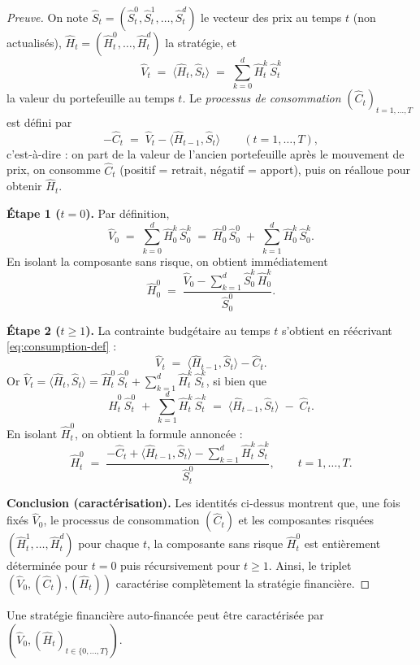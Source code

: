 \begin{proof}[Preuve]
On note $\hat S_t=(\hat S_t^0,\hat S_t^1,\ldots,\hat S_t^d)$ le vecteur des prix au temps $t$ (non actualisés),
$\hat H_t=(\hat H_t^0,\ldots,\hat H_t^d)$ la stratégie, et
\[
\hat V_t \;=\; \langle \hat H_t,\hat S_t\rangle \;=\; \sum_{k=0}^d \hat H_t^k\,\hat S_t^k
\]
la valeur du portefeuille au temps $t$.
Le \emph{processus de consommation} $(\hat C_t)_{t=1,\ldots,T}$ est défini par
\begin{equation}\label{eq:consumption-def}
-\hat C_t \;=\; \hat V_t - \langle \hat H_{t-1}, \hat S_t\rangle
\qquad (t=1,\ldots,T),
\end{equation}
c'est-à-dire : on part de la valeur de l'ancien portefeuille après le mouvement de prix,
on consomme $\hat C_t$ (positif = retrait, négatif = apport), puis on réalloue pour obtenir $\hat H_t$.

\smallskip
\noindent\textbf{Étape 1 ($t=0$).}
Par définition,
\[
\hat V_0 \;=\; \sum_{k=0}^d \hat H_0^k\,\hat S_0^k
\;=\; \hat H_0^0\,\hat S_0^0 \;+\; \sum_{k=1}^d \hat H_0^k\,\hat S_0^k.
\]
En isolant la composante sans risque, on obtient immédiatement
\[
\hat H_0^0 \;=\; \frac{\hat V_0 - \sum_{k=1}^d \hat S_0^k\,\hat H_0^k}{\hat S_0^0}.
\]

\smallskip
\noindent\textbf{Étape 2 ($t\ge 1$).}
La contrainte budgétaire au temps $t$ s'obtient en réécrivant \eqref{eq:consumption-def} :
\[
\hat V_t \;=\; \langle \hat H_{t-1}, \hat S_t\rangle - \hat C_t.
\]
Or $\hat V_t=\langle \hat H_t,\hat S_t\rangle = \hat H_t^0\,\hat S_t^0 + \sum_{k=1}^d \hat H_t^k\,\hat S_t^k$,
si bien que
\[
\hat H_t^0\,\hat S_t^0 \;+\; \sum_{k=1}^d \hat H_t^k\,\hat S_t^k
\;=\; \langle \hat H_{t-1}, \hat S_t\rangle \;-\; \hat C_t.
\]
En isolant $\hat H_t^0$, on obtient la formule annoncée :
\[
\hat H_t^0 \;=\; \frac{-\hat C_t + \langle \hat H_{t-1}, \hat S_t\rangle - \sum_{k=1}^d \hat H_t^k\,\hat S_t^k}{\hat S_t^0},
\qquad t=1,\ldots,T.
\]

\smallskip
\noindent\textbf{Conclusion (caractérisation).}
Les identités ci-dessus montrent que, une fois fixés
$\hat V_0$, le processus de consommation $(\hat C_t)$ et les composantes risquées
$(\hat H_t^1,\ldots,\hat H_t^d)$ pour chaque $t$, la composante sans risque $\hat H_t^0$
est entièrement déterminée pour $t=0$ puis récursivement pour $t\ge 1$.
Ainsi, le triplet $(\hat V_0,(\hat C_t),(\hat H_t))$ caractérise complètement la stratégie financière.
\end{proof}

\begin{corollaire}
Une stratégie financière auto-financée peut être caractérisée par $(\hat V_0, (\hat H_t)_{t\in\{0,\ldots,T\}})$.
\end{corollaire}


